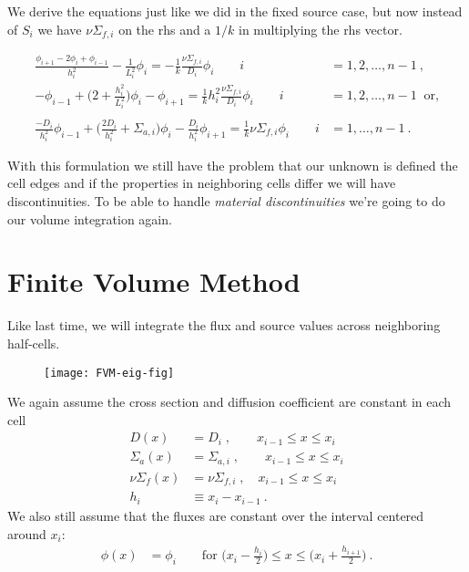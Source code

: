 \documentclass[12pt]{article}
\begin{document}
We derive the equations just like we did in the fixed source case, but now instead of $S_i$ we have $\nu \Sigma_{f,i}$ on the rhs and a $1/k$ in multiplying the rhs vector.

\begin{align}
\frac{\phi_{i+1} - 2\phi_i + \phi_{i-1}}{h_i^2} - \frac{1}{L_i^2}\phi_i = -\frac{1}{k}\frac{\nu\Sigma_{f,i}}{D_i}\phi_i \qquad i &= 1, 2, \dots, n-1 \:,\nonumber \\
%
-\phi_{i-1} + \bigl(2 + \frac{h_i^2}{L_i^2}\bigr)\phi_i - \phi_{i+1} = \frac{1}{k} h_i^2 \frac{\nu\Sigma_{f,i}}{D_i}\phi_i \qquad i &= 1, 2, \dots, n-1\: \text{ or,} \nonumber\\
%
\nonumber \\
\frac{-D_i}{h_i^2}\phi_{i-1} + \biggl(\frac{2D_i}{h_i^2} + \Sigma_{a,i} \biggr)\phi_i - \frac{D_i}{h_i^2}\phi_{i+1} = \frac{1}{k} \nu\Sigma_{f,i}\phi_i \qquad i &= 1, \dots, n-1 \:.\nonumber 
\end{align}

With this formulation we still have the problem that our unknown is defined the cell edges and if the properties in neighboring cells differ we will have discontinuities. To be able to handle \textit{material discontinuities} we're going to do our volume integration again.


\section*{Finite Volume Method}

Like last time, we will integrate the flux and source values across neighboring half-cells.
%
\begin{figure}[h!]
\texttt{[image: FVM-eig-fig]}
\end{figure}

We again assume the cross section and diffusion coefficient are constant in each cell 
\begin{align}
D(x) &= D_i\;, \qquad x_{i-1} \leq x \leq x_i \nonumber \\
\Sigma_a(x) &= \Sigma_{a,i}\;, \qquad x_{i-1} \leq x \leq x_i \nonumber \\
\nu\Sigma_f(x) &= \nu\Sigma_{f,i}\;, \quad x_{i-1} \leq x \leq x_i \nonumber \\
h_i &\equiv x_{i} - x_{i-1} \:.\nonumber 
\end{align}
%
We also still assume that the fluxes are constant over the interval centered around $x_i$:
%
\begin{align}
\phi(x) &= \phi_i \qquad \text{for } \bigl(x_i - \frac{h_i}{2}\bigr) \leq x \leq \bigl(x_i + \frac{h_{i+1}}{2}\bigr)\:. \nonumber %
\end{align}
\end{document}
